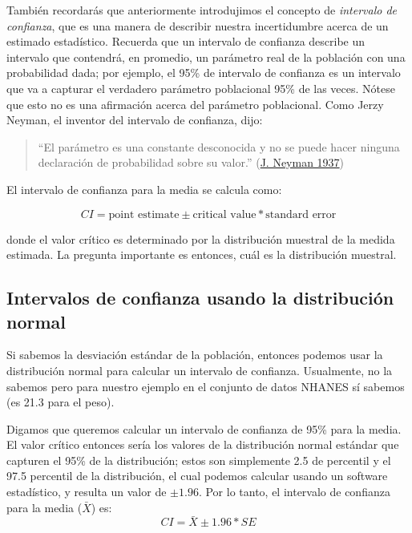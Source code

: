 \documentclass[
  12pt,
]{book}
\begin{document}
También recordarás que anteriormente introdujimos el concepto de \emph{intervalo de confianza}, que es una manera de describir nuestra incertidumbre acerca de un estimado estadístico. Recuerda que un intervalo de confianza describe un intervalo que contendrá, en promedio, un parámetro real de la población con una probabilidad dada; por ejemplo, el 95\% de intervalo de confianza es un intervalo que va a capturar el verdadero parámetro poblacional 95\% de las veces. Nótese que esto no es una afirmación acerca del parámetro poblacional. Como Jerzy Neyman, el inventor del intervalo de confianza, dijo:

\begin{quote}
``El parámetro es una constante desconocida y no se puede hacer ninguna declaración de probabilidad sobre su valor.'' (\protect\hyperlink{ref-Neyman37}{J. Neyman 1937})
\end{quote}

El intervalo de confianza para la media se calcula como:

\[
CI = \text{point estimate} \pm \text{critical value} * \text{standard error}
\]

donde el valor crítico es determinado por la distribución muestral de la medida estimada. La pregunta importante es entonces, cuál es la distribución muestral.

\hypertarget{intervalos-de-confianza-usando-la-distribuciuxf3n-normal}{%
\subsection{Intervalos de confianza usando la distribución normal}\label{intervalos-de-confianza-usando-la-distribuciuxf3n-normal}}

Si sabemos la desviación estándar de la población, entonces podemos usar la distribución normal para calcular un intervalo de confianza. Usualmente, no la sabemos pero para nuestro ejemplo en el conjunto de datos NHANES sí sabemos (es 21.3 para el peso).

Digamos que queremos calcular un intervalo de confianza de 95\% para la media. El valor crítico entonces sería los valores de la distribución normal estándar que capturen el 95\% de la distribución; estos son simplemente 2.5 de percentil y el 97.5 percentil de la distribución, el cual podemos calcular usando un software estadístico, y resulta un valor de \(\pm 1.96\). Por lo tanto, el intervalo de confianza para la media (\(\bar{X}\)) es:
\[
CI = \bar{X} \pm 1.96*SE
\]
\end{document}
